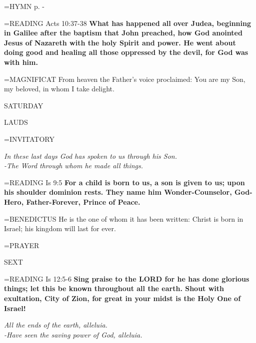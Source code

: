 \hangindent=\parindent \small{\uppercase{HYMN} p. \pageref{christmas:firstHymn}-\pageref{christmas:lastHymn}\\}

\hangindent=\parindent \small{\uppercase{READING}}    Acts 10:37-38 \textbf{   What has happened all over Judea, beginning in Galilee after the baptism that John preached, how God anointed Jesus of Nazareth with the holy Spirit and power. He went about doing good and healing all those oppressed by the devil, for God was with him.\\}

\hangindent=\parindent \small{MAGNIFICAT 	From heaven the Father's voice proclaimed: You are my Son, my beloved, in whom I take delight.\\}

\begin{center}
\normalsize SATURDAY
\end{center}

\begin{flushleft}\normalsize LAUDS\\\end{flushleft}

\hangindent=\parindent \small{INVITATORY}
\begin{center}
\textit{In these last days God has spoken to us through his Son.\\}
\textit{-The Word through whom he made all things.\\}
\end{center}

\hangindent=\parindent \small{\uppercase{READING}}    Is 9:5 \textbf{   For a child is born to us, a son is given to us; upon his shoulder dominion rests. They name him Wonder-Counselor, God-Hero, Father-Forever, Prince of Peace.\\}

\hangindent=\parindent \small{BENEDICTUS 	He is the one of whom it has been written: Christ is born in Israel; his kingdom will last for ever.\\}

\hangindent=\parindent \small{PRAYER 	}

\begin{flushleft}\normalsize SEXT\\\end{flushleft}

\hangindent=\parindent \small{\uppercase{READING}}    Is 12:5-6 \textbf{   Sing praise to the LORD for he has done glorious things; let this be known throughout all the earth. Shout with exultation, City of Zion, for great in your midst is the Holy One of Israel!\\}

\begin{center}
\textit{All the ends of the earth, alleluia.\\
-Have seen the saving power of God, alleluia.}
\end{center}

